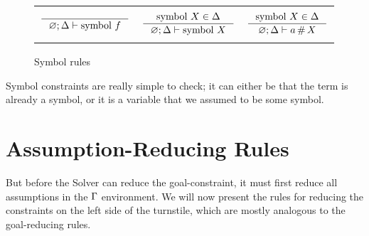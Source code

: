 \documentclass[english, mgr]{iithesis}
\newcommand{\solverRule}{\vdash}
\begin{document}
\begin{figure}[htbp]
    \centering
    \begin{tabularx}{\textwidth}{|CCC|}
      \hline & & \\ $
      \inference{
      }{
        \emptyenv ; \icEnv \solverRule \csymb \symb
      }
      $ & $
      \inference{
        \csymb \termv \in \icEnv
      }{
        \emptyenv ; \icEnv \solverRule \csymb \termv
      }
      $ & $
      \inference{
        \csymb \termv \in \icEnv
      }{
        \emptyenv ; \icEnv \solverRule \atomv \cfresh \termv
      }
      $ \\ & & \\ \hline
      \end{tabularx}
  \caption{Symbol rules}
  \label{fig:symbol-rules}
\end{figure}
Symbol constraints are really simple to check; it can either be that the term is already
a symbol, or it is a variable that we assumed to be some symbol.

\section{Assumption-Reducing Rules}
But before the Solver can reduce the goal-constraint, it must first reduce all assumptions in the $\Gamma$ environment.
We will now present the rules for reducing the constraints on the left side of the turnstile,
which are mostly analogous to the goal-reducing rules.
\end{document}
